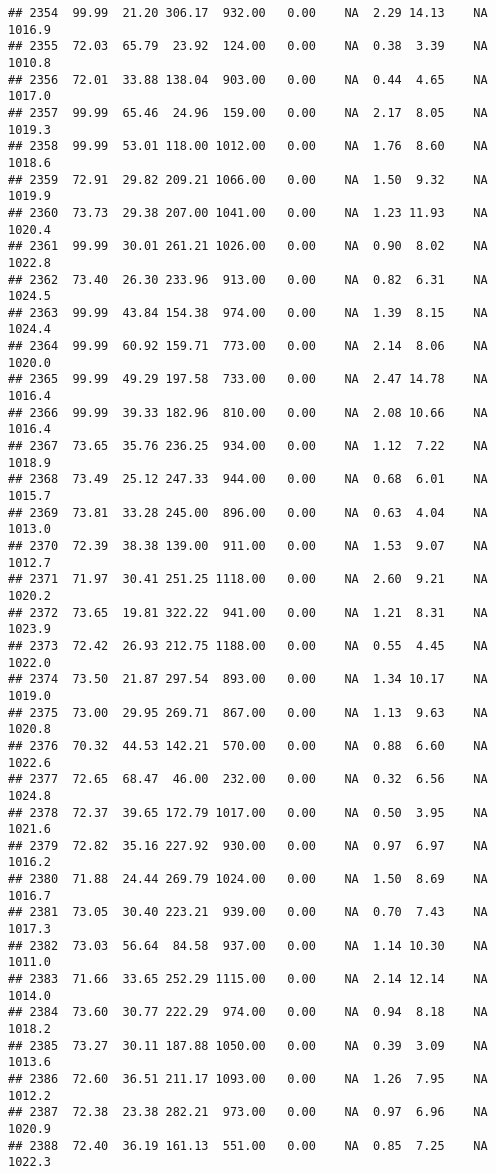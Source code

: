 \documentclass{article}\usepackage{graphicx, color}
\makeatletter
\newenvironment{kframe}{%
 \def\at@end@of@kframe{}%
 \ifinner\ifhmode%
  \def\at@end@of@kframe{\end{minipage}}%
  \begin{minipage}{\columnwidth}%
 \fi\fi%
 \def\FrameCommand##1{\hskip\@totalleftmargin \hskip-\fboxsep
 \colorbox{shadecolor}{##1}\hskip-\fboxsep
     \hskip-\linewidth \hskip-\@totalleftmargin \hskip\columnwidth}%
 \MakeFramed {\advance\hsize-\width
   \@totalleftmargin\z@ \linewidth\hsize
   \@setminipage}}%
 {\par\unskip\endMakeFramed%
 \at@end@of@kframe}
\newenvironment{knitrout}{}{} %
\makeatother
\begin{document}
\begin{knitrout}
\begin{kframe}
\begin{verbatim}
## 2354  99.99  21.20 306.17  932.00   0.00    NA  2.29 14.13    NA 1016.9
## 2355  72.03  65.79  23.92  124.00   0.00    NA  0.38  3.39    NA 1010.8
## 2356  72.01  33.88 138.04  903.00   0.00    NA  0.44  4.65    NA 1017.0
## 2357  99.99  65.46  24.96  159.00   0.00    NA  2.17  8.05    NA 1019.3
## 2358  99.99  53.01 118.00 1012.00   0.00    NA  1.76  8.60    NA 1018.6
## 2359  72.91  29.82 209.21 1066.00   0.00    NA  1.50  9.32    NA 1019.9
## 2360  73.73  29.38 207.00 1041.00   0.00    NA  1.23 11.93    NA 1020.4
## 2361  99.99  30.01 261.21 1026.00   0.00    NA  0.90  8.02    NA 1022.8
## 2362  73.40  26.30 233.96  913.00   0.00    NA  0.82  6.31    NA 1024.5
## 2363  99.99  43.84 154.38  974.00   0.00    NA  1.39  8.15    NA 1024.4
## 2364  99.99  60.92 159.71  773.00   0.00    NA  2.14  8.06    NA 1020.0
## 2365  99.99  49.29 197.58  733.00   0.00    NA  2.47 14.78    NA 1016.4
## 2366  99.99  39.33 182.96  810.00   0.00    NA  2.08 10.66    NA 1016.4
## 2367  73.65  35.76 236.25  934.00   0.00    NA  1.12  7.22    NA 1018.9
## 2368  73.49  25.12 247.33  944.00   0.00    NA  0.68  6.01    NA 1015.7
## 2369  73.81  33.28 245.00  896.00   0.00    NA  0.63  4.04    NA 1013.0
## 2370  72.39  38.38 139.00  911.00   0.00    NA  1.53  9.07    NA 1012.7
## 2371  71.97  30.41 251.25 1118.00   0.00    NA  2.60  9.21    NA 1020.2
## 2372  73.65  19.81 322.22  941.00   0.00    NA  1.21  8.31    NA 1023.9
## 2373  72.42  26.93 212.75 1188.00   0.00    NA  0.55  4.45    NA 1022.0
## 2374  73.50  21.87 297.54  893.00   0.00    NA  1.34 10.17    NA 1019.0
## 2375  73.00  29.95 269.71  867.00   0.00    NA  1.13  9.63    NA 1020.8
## 2376  70.32  44.53 142.21  570.00   0.00    NA  0.88  6.60    NA 1022.6
## 2377  72.65  68.47  46.00  232.00   0.00    NA  0.32  6.56    NA 1024.8
## 2378  72.37  39.65 172.79 1017.00   0.00    NA  0.50  3.95    NA 1021.6
## 2379  72.82  35.16 227.92  930.00   0.00    NA  0.97  6.97    NA 1016.2
## 2380  71.88  24.44 269.79 1024.00   0.00    NA  1.50  8.69    NA 1016.7
## 2381  73.05  30.40 223.21  939.00   0.00    NA  0.70  7.43    NA 1017.3
## 2382  73.03  56.64  84.58  937.00   0.00    NA  1.14 10.30    NA 1011.0
## 2383  71.66  33.65 252.29 1115.00   0.00    NA  2.14 12.14    NA 1014.0
## 2384  73.60  30.77 222.29  974.00   0.00    NA  0.94  8.18    NA 1018.2
## 2385  73.27  30.11 187.88 1050.00   0.00    NA  0.39  3.09    NA 1013.6
## 2386  72.60  36.51 211.17 1093.00   0.00    NA  1.26  7.95    NA 1012.2
## 2387  72.38  23.38 282.21  973.00   0.00    NA  0.97  6.96    NA 1020.9
## 2388  72.40  36.19 161.13  551.00   0.00    NA  0.85  7.25    NA 1022.3

\end{verbatim}
\end{kframe}
\end{knitrout}
\end{document}
